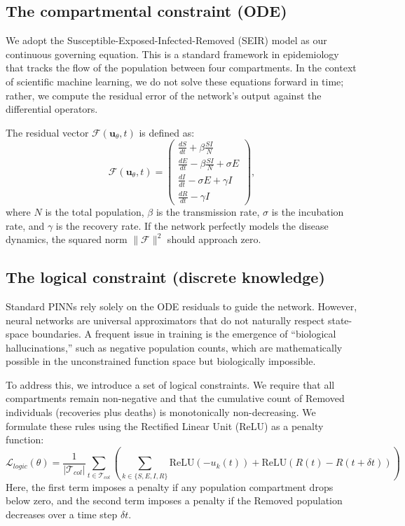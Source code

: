 \documentclass[11pt]{article}
\begin{document}
\subsection{The compartmental constraint (ODE)}
We adopt the Susceptible-Exposed-Infected-Removed (SEIR) model as our continuous governing equation. This is a standard framework in epidemiology that tracks the flow of the population between four compartments. In the context of scientific machine learning, we do not solve these equations forward in time; rather, we compute the residual error of the network's output against the differential operators.

The residual vector $\mathcal{F}(\mathbf{u}_\theta, t)$ is defined as:
\begin{equation}
    \mathcal{F}(\mathbf{u}_\theta, t) = 
    \begin{pmatrix}
    \frac{dS}{dt} + \beta \frac{SI}{N} \\[4pt]
    \frac{dE}{dt} - \beta \frac{SI}{N} + \sigma E \\[4pt]
    \frac{dI}{dt} - \sigma E + \gamma I \\[4pt]
    \frac{dR}{dt} - \gamma I
    \end{pmatrix},
\end{equation}
where $N$ is the total population, $\beta$ is the transmission rate, $\sigma$ is the incubation rate, and $\gamma$ is the recovery rate. If the network perfectly models the disease dynamics, the squared norm $\|\mathcal{F}\|^2$ should approach zero.

\subsection{The logical constraint (discrete knowledge)}
Standard PINNs rely solely on the ODE residuals to guide the network. However, neural networks are universal approximators that do not naturally respect state-space boundaries. A frequent issue in training is the emergence of ``biological hallucinations,'' such as negative population counts, which are mathematically possible in the unconstrained function space but biologically impossible.

To address this, we introduce a set of logical constraints. We require that all compartments remain non-negative and that the cumulative count of Removed individuals (recoveries plus deaths) is monotonically non-decreasing. We formulate these rules using the Rectified Linear Unit (ReLU) as a penalty function:
\begin{equation}
    \mathcal{L}_{logic}(\theta) = \frac{1}{|\mathcal{T}_{col}|} \sum_{t \in \mathcal{T}_{col}} \left( \sum_{k \in \{S,E,I,R\}} \text{ReLU}(-u_k(t)) + \text{ReLU}\left( R(t) - R(t+\delta t) \right) \right)
\end{equation}
Here, the first term imposes a penalty if any population compartment drops below zero, and the second term imposes a penalty if the Removed population decreases over a time step $\delta t$.
\end{document}
